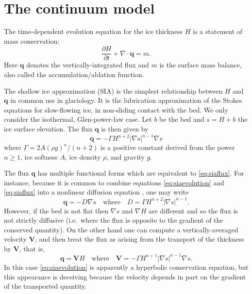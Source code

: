 \documentclass[twocolumn,letterpaper]{igs}
\newcommand\bq{\mathbf{q}}
\newcommand\bV{\mathbf{V}}
\newcommand{\Div}{\nabla\cdot}
\newcommand{\grad}{\nabla}
\begin{document}
\section*{The continuum model}

The time-dependent evolution equation for the ice thickness $H$ is a statement of mass conservation:
\begin{equation}
\frac{\partial H}{\partial t} + \Div \bq = m.  \label{eq:siaevolution}
\end{equation}
Here $\bq$ denotes the vertically-integrated flux and $m$ is the surface mass balance, also called the accumulation/ablation function.

The shallow ice approximation (SIA) is the simplest relationship between $H$ and $\bq$ in common use in glaciology.  It is the lubrication approximation \citep{Fowler1997} of the Stokes equations for slow-flowing ice, in non-sliding contact with the bed.  We only consider the isothermal, Glen-power-law \citep{GreveBlatter2009} case.  Let $b$ be the bed and $s = H+b$ the ice surface elevation.  The flux $\bq$ is then given by
\begin{equation}
\bq = - \Gamma H^{n+2} |\grad s|^{n-1} \grad s  \label{eq:siaflux}
\end{equation}
where $\Gamma = 2 A (\rho g)^n / (n+2)$ is a positive constant derived from the power $n\ge 1$, ice softness $A$, ice density $\rho$, and gravity $g$.

The flux $\bq$ has multiple functional forms which are equivalent to \eqref{eq:siaflux}.  For instance, because it is common to combine equations \eqref{eq:siaevolution} and \eqref{eq:siaflux} into a nonlinear diffusion equation \citep{Huybrechtsetal1996}, one may write
\begin{equation}
\bq = - D \grad s \quad \text{where} \quad D =  \Gamma H^{n+2} |\grad s|^{n-1}. \label{eq:siafluxdiffusion}
\end{equation}
However, if the bed is not flat then $\grad s$ and $\grad H$ are different and so the flux is not strictly diffusive (i.e.~where the flux is opposite to the gradient of the conserved quantity).  On the other hand one can compute a vertically-averaged velocity $\bV$, and then treat the flux as arising from the transport of the thickness by $\bV$, that is,
\begin{equation}
\bq = \bV H \quad \text{where} \quad \bV = - \Gamma H^{n+1} |\grad s|^{n-1} \grad s. \label{eq:siafluxvelocity}
\end{equation}
In this case \eqref{eq:siaevolution} is apparently a hyperbolic conservation equation, but this appearance is deceiving because the velocity depends in part on the gradient of the transported quantity.
\end{document}
